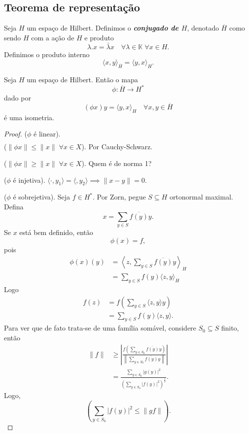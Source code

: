 \documentclass[portuguese]{article}
\theoremstyle{definition}
\begin{document}
\subsection{Teorema de representação}
\begin{defn}
	Seja $H$ um espaço de Hilbert. Definimos o \textbf{\textit{conjugado de $H$}}, denotado $\overline{H}$ como sendo $H$ com a ação de $H$ e produto
	\[\lambda.x=\bar{\lambda}x\quad\forall\lambda\in\mathbb{K}\;\forall x\in H.\]
	Definimos o produto interno
	\[\langle x,y\rangle_{\overline{H}}=\langle y,x\rangle_H.\]
\end{defn}
\begin{prop}
	Seja $H$ um espaço de Hilbert. Então o mapa
	\[\phi:\overline{H}\to H^*\]
	dado por
	\[(\phi x) y=\langle y,x\rangle_H\quad \forall x,y\in\overline{H}\]
	é uma isometria.
\end{prop}
\begin{proof}
	($\phi$ é linear).
	\begin{align*}
		[content...]
	\end{align*}
	($\|\phi x\|\leq\|x\|\;\forall x\in X$). Por Cauchy-Schwarz.
	
	($\|\phi x\|\geq\|x\|\;\forall x\in X$). Quem é de norma 1?
	
	($\phi$ é injetiva). $\langle\cdot,y_1\rangle=\langle\dot,y_2\rangle\implies \|x-y\|=0$.
	
	($\phi$ é sobrejetiva). Seja $f\in H^*$. Por Zorn, pegue $S\subseteq H$ ortonormal maximal. Defina
	\[x=\sum_{y\in S}\overline{f(y)}y.\]
	Se $x$ está bem definido, então
	\[\phi(x)=f,\]
	pois
	\begin{align*}
		\phi(x)(y)&=\left\langle z,\sum_{y\in S}\overline{f(y)}y\right\rangle_H\\
		&=\sum_{y\in S}f(y)\langle z,y\rangle_H
	\end{align*}
	Logo
	\begin{align*}
		f(z)&=f\left(\sum_{y\in S}\langle z,y\rangle y\right)\\
		&=\sum_{y\in S}f(y)\langle z,y\rangle.
	\end{align*}
	Para ver que de fato trata-se de uma família somável, considere $S_0\subseteq S$ finito, então
	\begin{align*}
		\|f\|&\geq\left|\frac{f\left(\sum_{y\in S_0}\overline{f(y)}y\right)}{\left\|\sum_{y\in S_0}\overline{f(y)}y\right\|}\right|\\
		&=\frac{\sum_{y\in S_0}|g(y)|^2}{\left(\sum_{y\in S_0}|f(y)|^2\right)^{\frac{1}{2}}}.
	\end{align*}
	Logo,
	\[\left(\sum_{y\in S_0}|f(y)|^2\leq\|gf\|\right).\]
\end{proof}
\end{document}
